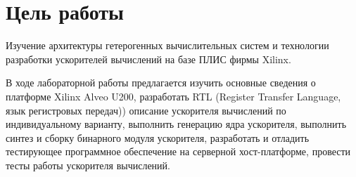 \setcounter{page}{2}

\chapter*{Цель работы}


Изучение архитектуры гетерогенных вычислительных систем и технологии разработки ускорителей вычислений на базе ПЛИС фирмы Xilinx. 

В ходе лабораторной работы предлагается изучить основные сведения о платформе Xilinx Alveo U200, разработать RTL (Register Transfer Language, язык регистровых передач)) описание ускорителя вычислений по индивидуальному варианту, выполнить генерацию ядра ускорителя, выполнить синтез и сборку бинарного модуля ускорителя, разработать и отладить тестирующее программное обеспечение на серверной хост-платформе, провести тесты работы ускорителя вычислений.



